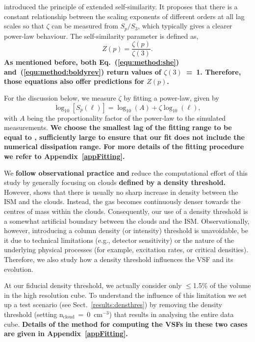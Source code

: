 \citet{Benzi1993} introduced the principle of extended self-similarity.
It proposes that there is a constant relationship between the scaling
exponents of different orders at all lag scales so that $\zeta$ can be measured from $S_p/S_3$, which typically gives a clearer power-law behaviour.
The self-similarity parameter is defined as,
\begin{equation}
	Z(p) = \frac{\zeta(p)}{\zeta(3)}.
	\label{equ:method:z_def}
\end{equation} 
\textbf{\noindent
    As mentioned before, both Eq.~(\ref{equ:method:she}) and~(\ref{equ:method:boldyrev}) return values of $\zeta(3)$~=~1.
    Therefore, those equations also offer predictions for $Z(p)$.
}

For the discussion below, we measure $\zeta$ by fitting a power-law,
given by
\begin{equation}
	\log_{10}\left[ S_p(\ell) \right] = \log_{10}\left(A\right) + \zeta \log_{10}(\ell) ,
	\label{equ:method:fitting}
\end{equation}
with $A$ being the proportionality factor of the power-law to the simulated measurements.
\textbf{
We choose the smallest lag of the fitting range to be equal to , sufficiently large to ensure that our fit does not include the numerical dissipation range.
For more details of the fitting procedure we refer to Appendix~\ref{appFitting}.
}

We \textbf{follow observational practice and} reduce the computational effort of this study by generally focusing on clouds {\bf defined by a density threshold.}
However,  shows that there is usually no sharp increase in density between the ISM and the clouds. 
Instead, the gas becomes continuously denser towards the centres of mass within the clouds. 
Consequently, our use of a density threshold is a somewhat artificial boundary between the clouds and the ISM. Observationally, however, introducing a column density (or intensity) threshold is unavoidable, be it due to technical limitations (e.g., detector sensitivity) or the nature of the underlying physical processes (for example, excitation rates, or critical densities).
Therefore, we also study how a density threshold influences the VSF and its evolution.

At our fiducial density threshold, we actually consider only $\leq$1.5\% of the volume in the high resolution cube.
To understand the influence of this limitation we set up a test scenario (see Sect.~\ref{results:densthres}) by removing the density threshold (setting n$_\mathrm{cloud}$~=~0~cm$^{-3}$) that results in analysing the entire data cube.
\textbf{Details of the method for computing the VSFs in these two cases are given in Appendix~\ref{appFitting}.}

